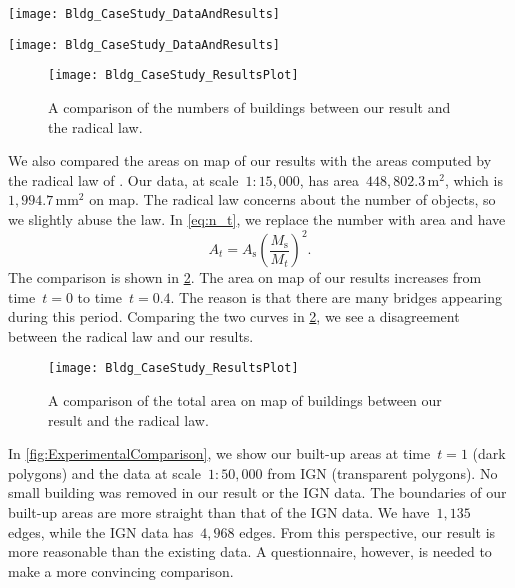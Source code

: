 \begin{figure*}[tb]
\centering
\texttt{[image: Bldg\_CaseStudy\_DataAndResults]}
\caption{A sequence of maps 
	at time~$t \in \{0, 0.1, 0.2, \dots, 1\}$ 
	of marked region~$R_1$
	in \fig\ref{fig:Bldg_GoalShape}.
}
\label{fig:ContinuousGeneralization}
\end{figure*}

\begin{figure*}[tb]
\centering
\texttt{[image: Bldg\_CaseStudy\_DataAndResults]}
\caption{Some intermediate-scale results of  
    marked region~$R_2$ in \fig\ref{fig:Bldg_GoalShape}.
    When time~$t=0.3$, there are some lengthy aggregates.
}
\label{fig:Bldg_Lengthy}
\end{figure*}

\begin{figure}[tb]
\centering
\texttt{[image: Bldg\_CaseStudy\_ResultsPlot]}
\caption{A comparison of the numbers of buildings 
	between our result and the radical law.}
\label{fig:NumberOfBuildings}
\end{figure}

We also compared the areas on map of our results 
with the areas computed by the radical law of \citet{Topfer1966}.
Our data, at scale~$1:15{,}000$, 
has area~$448{,}802.3\,\mathrm{m}^2$,
which is~$1{,}994.7\,\mathrm{mm}^2$ on map.
The radical law concerns about the number of 
objects, so we slightly abuse the law.
In \eq\ref{eq:n_t}, we replace the number with area and have
$$
A_t=A_\mathrm{s}\left( \frac{M_\mathrm{s}}{M_t}\right) ^2.
$$
The comparison is shown in \fig\ref{fig:AreaOfBuildings}.
The area on map of our results increases 
from time~$t=0$ to time~$t=0.4$. 
The reason is that 
there are many bridges appearing during this period.
Comparing the two curves in \fig\ref{fig:AreaOfBuildings},
we see a disagreement between
the radical law and our results.

\begin{figure}[tb]
\centering
\texttt{[image: Bldg\_CaseStudy\_ResultsPlot]}
\caption{A comparison of the total area on map of buildings 
	between our result and the radical law.}
\label{fig:AreaOfBuildings}
\end{figure}

In \fig\ref{fig:ExperimentalComparison},
we show our built-up areas at time~$t=1$ (dark polygons)
and the data at scale~$1:50{,}000$ 
from IGN (transparent polygons).
No small building was removed in
our result or the IGN data.
The boundaries of our built-up areas 
are more straight than that of the IGN data. 
We have~$1{,}135$ edges, 
while the IGN data has~$4{,}968$ edges.
From this perspective, our result is 
more reasonable than the existing data.
A questionnaire, however, is needed to 
make a more convincing comparison.


